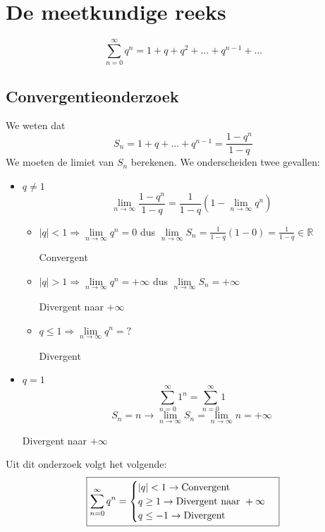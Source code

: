 \section{De meetkundige reeks}
$$\sum_{n = 0}^{\infty} q^n = 1 + q + q^2 + ... + q^{n - 1} + ...$$
\subsection{Convergentieonderzoek}
We weten dat
$$S_n = 1 + q + ... + q^{n - 1} = \frac{1 - q^n}{1 - q}$$
We moeten de limiet van $S_n$ berekenen. We onderscheiden twee gevallen:
\begin{itemize}
	\item $q \neq 1$
	      $$\lim\limits_{n\to\infty}\frac{1 - q^n}{1 - q} = \frac{1}{1 - q}(1 - \lim\limits_{n\to\infty} q^n)$$
	      \begin{itemize}[label={als}]
		      \item $|q| < 1 \Rightarrow \lim\limits_{n\to\infty} q^n = 0$
		            dus
		            $\lim\limits_{n\to\infty} S_n = \frac{1}{1 - q}(1 - 0) = \frac{1}{1 - q} \in \mathbb{R}$

		            Convergent
		      \item $|q| > 1 \Rightarrow \lim\limits_{n\to\infty} q^n = +\infty$
		            dus
		            $\lim\limits_{n\to\infty} S_n = +\infty$

		            Divergent naar $+\infty$
		      \item $q \leq 1 \Rightarrow \lim\limits_{n\to\infty} q^n = ?$

		            Divergent
	      \end{itemize}
	\item $q = 1$
	      $$\sum_{n = 0}^{\infty} 1^n = \sum_{n = 0}^{\infty} 1$$
	      $$S_n = n \rightarrow \lim\limits_{n\to\infty} S_n = \lim\limits_{n\to\infty} n = +\infty$$

	      Divergent naar $+\infty$
\end{itemize}

Uit dit onderzoek volgt het volgende:
$$
	\boxed{
		\sum_{n = 0}^{\infty} q^n = \begin{cases}
			|q| < 1 \rightarrow \hbox{Convergent}               \\
			q \geq 1 \rightarrow \hbox{Divergent naar } +\infty \\
			q \leq -1 \rightarrow \hbox{Divergent}
		\end{cases}
	}
$$


